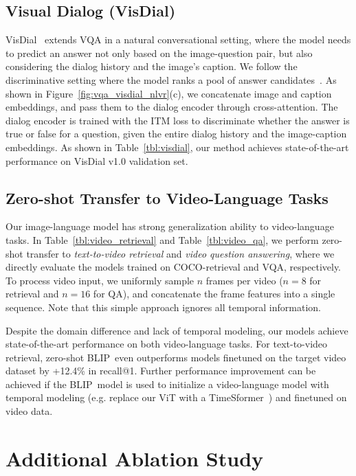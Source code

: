 \subsection{Visual Dialog (VisDial)}

VisDial~\cite{VisDial} extends VQA in a natural conversational setting, where the model needs to predict an answer not only based on the image-question pair, but also considering the dialog history and the image's caption. We follow the discriminative setting where the model ranks a pool of answer candidates~\cite{ReDAN,VD-BERT,visdial_eccv}. As shown in Figure~\ref{fig:vqa_visdial_nlvr}(c),
we concatenate image and caption embeddings, and pass them to the dialog encoder through cross-attention. The dialog encoder is trained with the ITM loss to discriminate whether the answer is true or false for a question, given the entire dialog history and the image-caption embeddings. As shown in Table~\ref{tbl:visdial},
our method achieves state-of-the-art performance on VisDial v1.0 validation set.

\subsection{Zero-shot Transfer to Video-Language Tasks}

Our image-language model has strong generalization ability to video-language tasks. In Table~\ref{tbl:video_retrieval} and Table~\ref{tbl:video_qa},
we perform zero-shot transfer to \textit{text-to-video retrieval} and \textit{video question answering}, where we directly evaluate the models trained on COCO-retrieval and VQA, respectively. To process video input, we uniformly sample $n$ frames per video ($n=8$ for retrieval and $n=16$ for QA), and concatenate the frame features into a single sequence. Note that this simple approach ignores all temporal information.

Despite the domain difference and lack of temporal modeling, our models achieve state-of-the-art performance on both video-language tasks. For text-to-video retrieval, zero-shot BLIP~even outperforms models finetuned on the target video dataset by +12.4\% in recall@1. Further performance improvement can be achieved if the BLIP~model is used to initialize a video-language model with temporal modeling (e.g. replace our ViT with a TimeSformer~\cite{timesformer}) and finetuned on video data.

\section{Additional Ablation Study}

